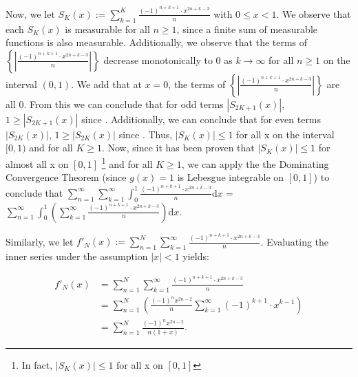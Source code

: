\documentclass{article}
\begin{document}
Now, we let $S_K(x):=\sum_{k=1}^{K}\frac{ (-1)^{n+k+1}\cdot x^{2n+k-3}}{n}$ with $0 \leq x < 1$. We observe that each $S_K(x)$ is measurable for all $n\geq1$, since a finite sum of measurable functions is also measurable. Additionally, we observe that the terms of $\left\{\left|\frac{ (-1)^{n+k+1}\cdot x^{2n+k-3}}{n}\right|\right\}$ decrease monotonically to 0 as $k \to \infty$ for all $n \geq 1$ on the interval $(0, 1)$. We add that at $x=0$,  the terms of $\left\{\left|\frac{ (-1)^{n+k+1}\cdot x^{2n+k-3}}{n}\right|\right\}$ are all 0. From this we can conclude that for odd terms $|S_{2K+1}(x)|$, $1 \geq |S_{2K+1}(x)|$ since . \newline Additionally, we can conclude that for even terms $|S_{2K}(x)|$, $1\geq|S_{2K}(x)|$ since  . \newline Thus, $|S_K(x)|\leq1$ for all x on the interval $[0,1)$ and for all $K \geq 1$.  Now, since it has been proven that $|S_K(x)|\leq1$ for almost all x on $[0,1]$ \footnote{In fact, $|S_K(x)| \leq 1$ for all x on $[0,1]$} and for all $K \geq 1$, we can apply the the Dominating Convergence Theorem (since $g(x)=1$ is Lebesgue integrable on $[0,1]$) to conclude that $\sum_{n=1}^{\infty}\sum_{k=1}^{\infty}\int_{0}^{1}\frac{ (-1)^{n+k+1}\cdot x^{2n+k-3}}{n} \mathrm{d}x=$ \newline $\sum_{n=1}^{\infty}\int_{0}^{1}\left(\sum_{k=1}^{\infty}\frac{ (-1)^{n+k+1}\cdot x^{2n+k-3}}{n}\right) \mathrm{d}x$.

\vspace{20mm}

Similarly, we let $f'_N(x):=\sum_{n=1}^{N}\sum_{k=1}^{\infty}\frac{ (-1)^{n+k+1}\cdot x^{2n+k-3}}{n}$. Evaluating the inner series under the assumption $|x|<1$ yields:

\begin{align*}
    f'_N(x) &= \sum_{n=1}^{N}\sum_{k=1}^{\infty}\frac{ (-1)^{n+k+1}\cdot x^{2n+k-3}}{n} \\
    &= \sum_{n=1}^{N}\left(\frac{(-1)^{n}x^{2n-2}}{n}\sum_{k=1}^{\infty}(-1)^{k+1}\cdot x^{k-1}\right)\\
    &=\sum_{n=1}^{N} \frac{(-1)^nx^{2n-2}}{n(1+x)}.
\end{align*}
\end{document}
